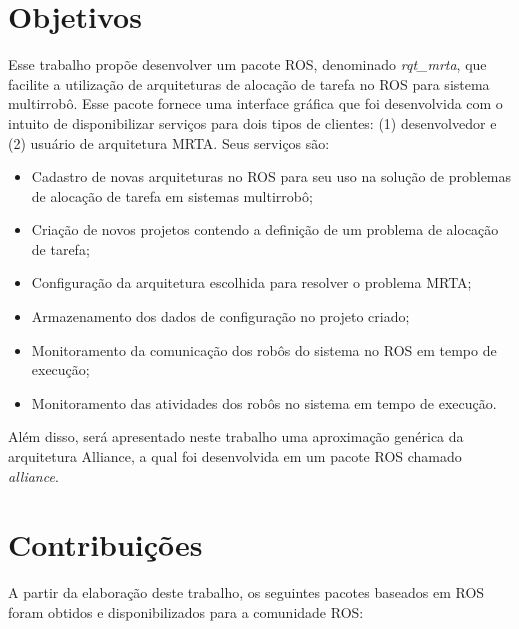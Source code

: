    \section{Objetivos} \label{sec:objetivos}
        Esse trabalho propõe desenvolver um pacote ROS, denominado \textit{rqt\_mrta}, que facilite a utilização de arquiteturas de alocação de tarefa no ROS para sistema multirrobô. Esse pacote fornece uma interface gráfica que foi desenvolvida com o intuito de disponibilizar serviços para dois tipos de clientes: (1) desenvolvedor e (2) usuário de arquitetura MRTA. Seus serviços são:
        
        \begin{itemize}
            \item Cadastro de novas arquiteturas no ROS para seu uso na solução de problemas de alocação de tarefa em sistemas multirrobô;
            \item Criação de novos projetos contendo a definição de um problema de alocação de tarefa;
            \item Configuração da arquitetura escolhida para resolver o problema MRTA;
            \item Armazenamento dos dados de configuração no projeto criado;
            \item Monitoramento da comunicação dos robôs do sistema no ROS em tempo de execução;
            \item Monitoramento das atividades dos robôs no sistema em tempo de execução.
        \end{itemize}
        
        Além disso, será apresentado neste trabalho uma aproximação genérica da arquitetura Alliance, a qual foi desenvolvida em um pacote ROS chamado \textit{alliance}.
        
    \section{Contribuições} \label{sec:contribuicoes}
        A partir da elaboração deste trabalho, os seguintes pacotes baseados em ROS foram obtidos e disponibilizados para a comunidade ROS:
        
